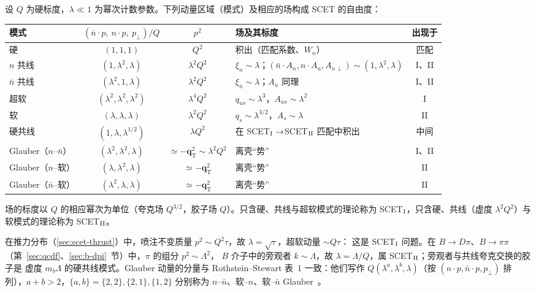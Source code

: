 \begin{definition}\label{def:scet-modes}
设 $Q$ 为硬标度，$\lambda\ll1$ 为幂次计数参数。下列动量区域（模式）及相应的场构成 SCET 的自由度：
\begin{center}
\small
\renewcommand{\arraystretch}{1.25}
\begin{tabularx}{\linewidth}{@{}l c c >{\raggedright\arraybackslash}X c@{}}
\toprule
模式 & $(\bar n\cdot p,\ n\cdot p,\ p_\perp)/Q$ & $p^2$ & 场及其标度 & 出现于 \\
\midrule
硬 & $(1,1,1)$ & $Q^2$ & 积出（匹配系数、$W_n$） & 匹配 \\
$n$ 共线 & $(1,\lambda^2,\lambda)$ & $\lambda^2Q^2$ & $\xi_n\sim\lambda$；$(\bar n\cdot A_n,n\cdot A_n,A_{n\perp})\sim(1,\lambda^2,\lambda)$ & I、II \\
$\bar n$ 共线 & $(\lambda^2,1,\lambda)$ & $\lambda^2Q^2$ & $\xi_{\bar n}\sim\lambda$；$A_{\bar n}$ 同理 & I、II \\
超软 & $(\lambda^2,\lambda^2,\lambda^2)$ & $\lambda^4Q^2$ & $q_{us}\sim\lambda^3$，$A_{us}\sim\lambda^2$ & I \\
软 & $(\lambda,\lambda,\lambda)$ & $\lambda^2Q^2$ & $q_s\sim\lambda^{3/2}$，$A_s\sim\lambda$ & II \\
硬共线 & $(1,\lambda,\lambda^{1/2})$ & $\lambda Q^2$ & 在 SCET$_{\rm I}\to$SCET$_{\rm II}$ 匹配中积出 & 中间 \\
Glauber（$n$–$\bar n$） & $(\lambda^2,\lambda^2,\lambda)$ & $\simeq-\bm q_{\mathrm T}^2\sim\lambda^2Q^2$ & 离壳“势” & I、II \\
Glauber（$n$–软） & $(\lambda,\lambda^2,\lambda)$ & $\simeq-\bm q_{\mathrm T}^2$ & 离壳“势” & II \\
Glauber（$\bar n$–软） & $(\lambda^2,\lambda,\lambda)$ & $\simeq-\bm q_{\mathrm T}^2$ & 离壳“势” & II \\
\bottomrule
\end{tabularx}
\end{center}
场的标度以 $Q$ 的相应幂次为单位（夸克场 $Q^{3/2}$，胶子场 $Q$）。只含硬、共线与超软模式的理论称为
SCET$_{\rm I}$，只含硬、共线（虚度 $\lambda^2Q^2$）与软模式的理论称为 SCET$_{\rm II}$。
\end{definition}

在推力分布（\cref{sec:scet-thrust}）中，喷注不变质量 $p^2\sim Q^2\tau$，故 $\lambda=\sqrt\tau$，超软动量 $\sim Q\tau$：
这是 SCET$_{\rm I}$ 问题。在 $B\to D\pi$、$B\to\pi\pi$（第~\ref{sec:qcdf}、\ref{sec:b-dpi}~节）中，$\pi$ 的组分 $p^2\sim\Lambda^2$，
$B$ 介子中的旁观者 $k\sim\Lambda$，故 $\lambda=\Lambda/Q$，属 SCET$_{\rm II}$；旁观者与共线夸克交换的胶子是
虚度 $m_b\Lambda$ 的硬共线模式。Glauber 动量的分量与 Rothstein--Stewart 表~1 一致：他们写作
$Q(\lambda^a,\lambda^b,\lambda)$（按 $(n\cdot p,\bar n\cdot p,p_\perp)$ 排列），$a+b>2$，$\{a,b\}=\{2,2\},\{2,1\},\{1,2\}$
分别称为 $n$–$\bar n$、软–$n$、软–$\bar n$ Glauber~\cite{RothsteinStewart2016}。

